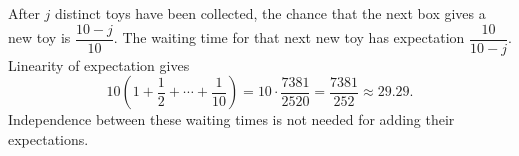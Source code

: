 After $j$ distinct toys have been collected, the chance that the next box gives a new toy is $\dfrac{10-j}{10}$. The waiting time for that next new toy has expectation $\dfrac{10}{10-j}$. Linearity of expectation gives\[10\left(1+\dfrac{1}{2}+\cdots+\dfrac{1}{10}\right)=10\cdot\dfrac{7381}{2520}=\boxed{\dfrac{7381}{252}}\approx 29.29.\]Independence between these waiting times is not needed for adding their expectations.
